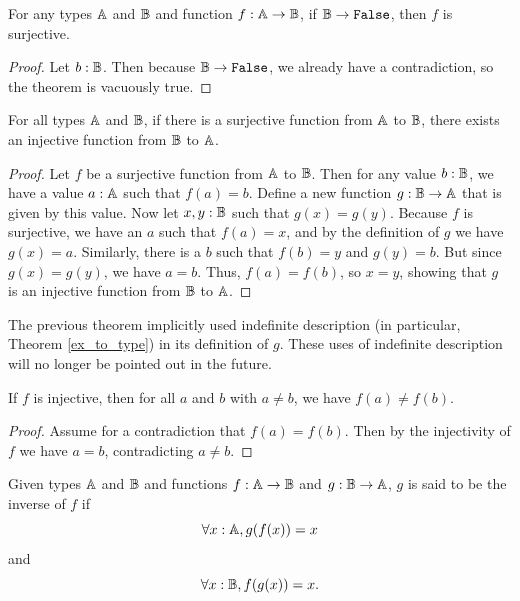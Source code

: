 \documentclass[../../math.tex]{subfiles}
\begin{document}
\begin{instance}
    For any types $\mathbb{A}$ and $\mathbb{B}$ and function $f : \mathbb{A} \rightarrow \mathbb{B}$, if $\B
    \rightarrow \vtt{False}$, then $f$ is surjective.
\end{instance}
\begin{proof}
    Let $b : \mathbb{B}$.  Then because $\B \rightarrow \vtt{False}$, we already have a
    contradiction, so the theorem is vacuously true.
\end{proof}

\begin{theorem} \label{partition_principle}
    For all types $\mathbb{A}$ and $\mathbb{B}$, if there is a surjective function from $\mathbb{A}$ to
    $\mathbb{B}$, there exists an injective function from $\mathbb{B}$ to $\mathbb{A}$.
\end{theorem}
\begin{proof}
    Let $f$ be a surjective function from $\mathbb{A}$ to $\mathbb{B}$.  Then for any value $b :
    \mathbb{B}$, we have a value $a : \mathbb{A}$ such that $f(a) = b$.  Define a new function
    $g : \mathbb{B} \rightarrow \mathbb{A}$ that is given by this value.  Now let $x, y : \mathbb{B}$
    such that $g(x) = g(y)$.  Because $f$ is surjective, we have an $a$ such
    that $f(a) = x$, and by the definition of $g$ we have $g(x) = a$.
    Similarly, there is a $b$ such that $f(b) = y$ and $g(y) = b$.  But since
    $g(x) = g(y)$, we have $a = b$.  Thus, $f(a) = f(b)$, so $x = y$, showing
    that $g$ is an injective function from $\mathbb{B}$ to $\mathbb{A}$.
\end{proof}

The previous theorem implicitly used indefinite description (in particular,
Theorem \ref{ex_to_type}) in its definition of $g$.  These uses of indefinite
description will no longer be pointed out in the future.

\begin{theorem}
    If $f$ is injective, then for all $a$ and $b$ with $a \neq b$, we have $f(a)
    \neq f(b)$.
\end{theorem}
\begin{proof}
    Assume for a contradiction that $f(a) = f(b)$.  Then by the injectivity of
    $f$ we have $a = b$, contradicting $a \neq b$.
\end{proof}

\begin{definition}
    Given types $\mathbb{A}$ and $\mathbb{B}$ and functions $f : \mathbb{A} \rightarrow \mathbb{B}$ and $g : \mathbb{B}
    \rightarrow \mathbb{A}$, $g$ is said to be the inverse of $f$ if
    \[
        \forall x : \mathbb{A}, g(f(x)) = x
    \]
    and
    \[
        \forall x : \mathbb{B}, f(g(x)) = x.
    \]
\end{definition}
\end{document}
